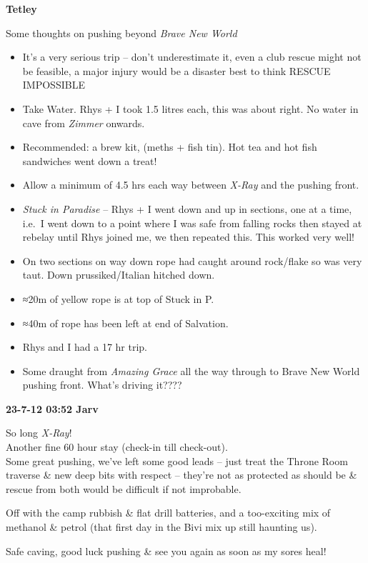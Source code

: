 \textbf{Tetley}

Some thoughts on pushing beyond \emph{Brave New World}

\begin{itemize}
\tightlist
\item
  It's a very serious trip -- don't underestimate it, even a club rescue
  might not be feasible, a major injury would be a disaster best to
  think RESCUE IMPOSSIBLE
\item
  Take Water. Rhys + I took 1.5 litres each, this was about right. No
  water in cave from \emph{Zimmer} onwards.
\item
  Recommended: a brew kit, (meths + fish tin). Hot tea and hot fish
  sandwiches went down a treat!
\item
  Allow a minimum of 4.5 hrs each way between \emph{X-Ray} and the
  pushing front.
\item
  \emph{Stuck in Paradise} -- Rhys + I went down and up in sections, one
  at a time, i.e.~I went down to a point where I was safe from falling
  rocks then stayed at rebelay until Rhys joined me, we then repeated
  this. This worked very well!
\item
  On two sections on way down rope had caught around rock/flake so was
  very taut. Down prussiked/Italian hitched down.
\item
  ≈20m of yellow rope is at top of Stuck in P.
\item
  ≈40m of rope has been left at end of Salvation.
\item
  Rhys and I had a 17 hr trip.
\item
  Some draught from \emph{Amazing Grace} all the way through to Brave
  New World pushing front. What's driving it????
\end{itemize}

\textbf{23-7-12 03:52 Jarv}

So long \emph{X-Ray}!\\
Another fine 60 hour stay (check-in till check-out).\\
Some great pushing, we've left some good leads -- just treat the Throne
Room traverse \& new deep bits with respect -- they're not as protected
as should be \& rescue from both would be difficult if not improbable.

Off with the camp rubbish \& flat drill batteries, and a too-exciting
mix of methanol \& petrol (that first day in the Bivi mix up still
haunting us).

Safe caving, good luck pushing \& see you again as soon as my sores
heal!

